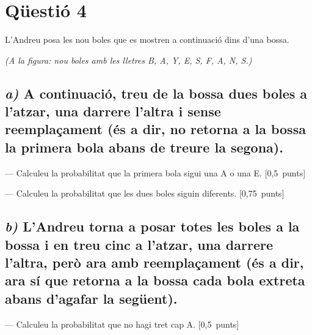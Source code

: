 \documentclass[11pt,a4paper]{article}
\begin{document}
\section*{\textcolor{blauPista}{Qüestió 4}}

\noindent L'Andreu posa les nou boles que es mostren a continuació dins d'una bossa.

\noindent\textit{(A la figura: nou boles amb les lletres B, A, Y, E, S, F, A, N, S.)}

\subsection*{\textit{a)} \normalfont A continuació, treu de la bossa dues boles a l'atzar, una darrere l'altra i sense reemplaçament (és a dir, no retorna a la bossa la primera bola abans de treure la segona).}

\noindent --- Calculeu la probabilitat que la primera bola sigui una A o una E. \hspace*{\fill}\textnormal{[0,5~punts]}


\noindent --- Calculeu la probabilitat que les dues boles siguin diferents. \hspace*{\fill}\textnormal{[0,75~punts]}


\subsection*{\textit{b)} \normalfont L'Andreu torna a posar totes les boles a la bossa i en treu cinc a l'atzar, una darrere l'altra, però ara amb reemplaçament (és a dir, ara sí que retorna a la bossa cada bola extreta abans d'agafar la següent).}

\noindent --- Calculeu la probabilitat que no hagi tret cap A. \hspace*{\fill}\textnormal{[0,5~punts]}
\end{document}
